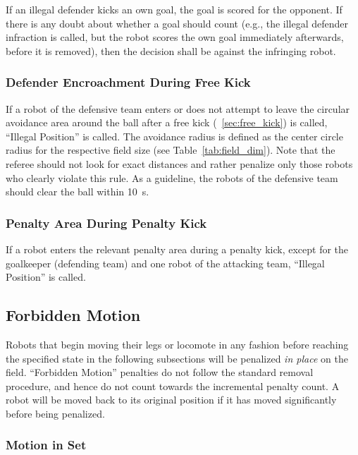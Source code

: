 If an illegal defender kicks an own goal, the goal is scored for the opponent. If there is any doubt about whether a goal should count (e.g., the illegal defender infraction is called, but the robot scores the own goal immediately afterwards, before it is removed), then the decision shall be against the infringing robot.

\subsubsection{Defender Encroachment During Free Kick}
\label{sec:ip_free_kick}

If a robot of the defensive team enters or does not attempt to leave the circular avoidance area around the ball after a free kick (\cf~\cref{sec:free_kick}) is called, ``Illegal Position'' is called. The avoidance radius is defined as the center circle radius for the respective field size (see Table~\ref{tab:field_dim}). Note that the referee should not look for exact distances and rather penalize only those robots who clearly violate this rule. As a guideline, the robots of the defensive team should clear the ball within \qty{10}{\second}.

\subsubsection{Penalty Area During Penalty Kick}
\label{sec:ip_penalty_kick}

If a robot enters the relevant penalty area during a penalty kick, except for the goalkeeper (defending team) and one robot of the attacking team, ``Illegal Position'' is called.

\subsection{Forbidden Motion}
\label{sec:forbidden_motion}

Robots that begin moving their legs or locomote in any fashion before reaching the specified state in the following subsections will be penalized \textit{in place} on the field. ``Forbidden Motion'' penalties do not follow the standard removal procedure, and hence do not count towards the incremental penalty count. A robot will be moved back to its original position if it has moved significantly before being penalized.

\subsubsection{Motion in Set}
\label{sec:motion_in_set}

